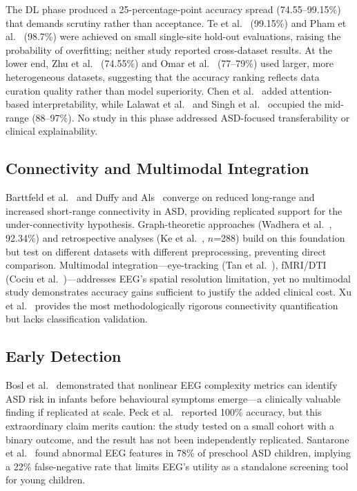The DL phase produced a 25-percentage-point accuracy spread (74.55--99.15\%) that demands scrutiny rather than acceptance. Te et al.~\cite{te2021spectrogram} (99.15\%) and Pham et al.~\cite{pham2020bispectrum} (98.7\%) were achieved on small single-site hold-out evaluations, raising the probability of overfitting; neither study reported cross-dataset results. At the lower end, Zhu et al.~\cite{zhu2024cnnlstm} (74.55\%) and Omar et al.~\cite{omar2024multicnn} (77--79\%) used larger, more heterogeneous datasets, suggesting that the accuracy ranking reflects data curation quality rather than model superiority. Chen et al.~\cite{chen2021bilstm} added attention-based interpretability, while Lalawat et al.~\cite{lalawat2024tfd} and Singh et al.~\cite{singh2023csto} occupied the mid-range (88--97\%). No study in this phase addressed ASD-focused transferability or clinical explainability.

\subsection{Connectivity and Multimodal Integration}

Barttfeld et al.~\cite{barttfeld2010bigworld} and Duffy and Als~\cite{duffy2012coherence} converge on reduced long-range and increased short-range connectivity in ASD, providing replicated support for the under-connectivity hypothesis. Graph-theoretic approaches (Wadhera et al.~\cite{wadhera2023graph}, 92.34\%) and retrospective analyses (Ke et al.~\cite{ke2024retrospective}, $n$=288) build on this foundation but test on different datasets with different preprocessing, preventing direct comparison. Multimodal integration---eye-tracking (Tan et al.~\cite{tan2023eyetrack}), fMRI/DTI (Cociu et al.~\cite{cociu2018multimodal})---addresses EEG's spatial resolution limitation, yet no multimodal study demonstrates accuracy gains sufficient to justify the added clinical cost. Xu et al.~\cite{xu2024connectivity} provides the most methodologically rigorous connectivity quantification but lacks classification validation.

\subsection{Early Detection}

Bosl et al.~\cite{bosl2018eeg} demonstrated that nonlinear EEG complexity metrics can identify ASD risk in infants before behavioural symptoms emerge---a clinically valuable finding if replicated at scale. Peck et al.~\cite{peck2021infant} reported 100\% accuracy, but this extraordinary claim merits caution: the study tested on a small cohort with a binary outcome, and the result has not been independently replicated. Santarone et al.~\cite{santarone2023eeg} found abnormal EEG features in 78\% of preschool ASD children, implying a 22\% false-negative rate that limits EEG's utility as a standalone screening tool for young children.

